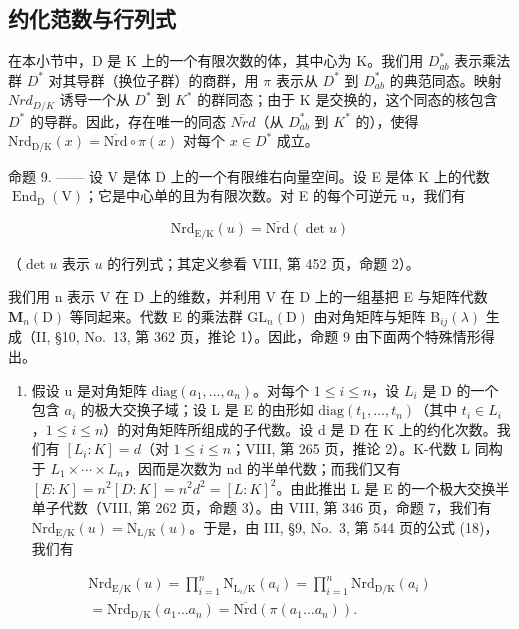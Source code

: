 \subsection{约化范数与行列式}

在本小节中，D 是 K 上的一个有限次数的体，其中心为 K。我们用 \(D_{ab}^{*}\) 表示乘法群 \(D^{*}\) 对其导群（换位子群）的商群，用 \(\pi\) 表示从 \(D^{*}\) 到 \(D_{ab}^{*}\) 的典范同态。映射 \(Nrd_{D/K}\) 诱导一个从 \(D^{*}\) 到 \(K^{*}\) 的群同态；由于 K 是交换的，这个同态的核包含 \(D^{*}\) 的导群。因此，存在唯一的同态 \(\overline{Nrd}\)（从 \(D_{ab}^{*}\) 到 \(K^{*}\) 的），使得 \(\mathrm{Nrd}_{\mathrm{D/K}}(x)=\overline{\mathrm{Nrd}}\circ\pi(x)\) 对每个 \(x\in D^{*}\) 成立。

命题 9. —— 设 V 是体 D 上的一个有限维右向量空间。设 E 是体 K 上的代数 \(\operatorname{End}_{\mathrm{D}}(\mathrm{V})\)；它是中心单的且为有限次数。对 E 的每个可逆元 u，我们有

\[
\mathrm{Nrd} _ {\mathrm{E/K}} (u) = \overline {{\mathrm{Nrd}}} (\det u)\tag{64}
\]

（\(\det u\) 表示 \(u\) 的行列式；其定义参看 VIII, 第 452 页，命题 2）。

我们用 n 表示 V 在 D 上的维数，并利用 V 在 D 上的一组基把 E 与矩阵代数 \(\mathbf{M}_{n}(\mathrm{D})\) 等同起来。代数 E 的乘法群 \(\mathrm{GL}_{n}(\mathrm{D})\) 由对角矩阵与矩阵 \(\mathrm{B}_{ij}(\lambda)\) 生成（II, §10, No.~13, 第 362 页，推论 1）。因此，命题 9 由下面两个特殊情形得出。

\begin{enumerate}
\def\labelenumi{\Alph{enumi})}
\tightlist
\item
  假设 u 是对角矩阵 \(\mathrm{diag}(a_{1},\ldots,a_{n})\)。对每个 \(1\leqslant i\leqslant n\)，设 \(L_{i}\) 是 D 的一个包含 \(a_{i}\) 的极大交换子域；设 L 是 E 的由形如 \(\mathrm{diag}(t_{1},\ldots,t_{n})\)（其中 \(t_{i}\in L_{i}\)，\(1\leqslant i\leqslant n\)）的对角矩阵所组成的子代数。设 d 是 D 在 K 上的约化次数。我们有 \([L_{i}:K]=d\)（对 \(1\leqslant i\leqslant n\)；VIII, 第 265 页，推论 2）。K-代数 L 同构于 \(L_{1}\times\cdots\times L_{n}\)，因而是次数为 nd 的半单代数；而我们又有 \([E:K]=n^{2}[D:K]=n^{2}d^{2}=[L:K]^{2}\)。由此推出 L 是 E 的一个极大交换半单子代数（VIII, 第 262 页，命题 3）。由 VIII, 第 346 页，命题 7，我们有 \(\mathrm{Nrd}_{\mathrm{E}/\mathrm{K}}(u)=\mathrm{N}_{\mathrm{L}/\mathrm{K}}(u)\)。于是，由 III, §9, No.~3, 第 544 页的公式 (18)，我们有
\end{enumerate}

\[
\begin{array}{c} \mathrm{Nrd} _ {\mathrm{E/K}} (u) = \prod_ {i = 1} ^ {n} \mathrm{N} _ {\mathrm{L} _ {i} / \mathrm{K}} (a _ {i}) = \prod_ {i = 1} ^ {n} \mathrm{Nrd} _ {\mathrm{D/K}} (a _ {i}) \\ = \mathrm{Nrd} _ {\mathrm{D/K}} (a _ {1} \dots a _ {n}) = \overline {{\mathrm{Nrd}}} (\pi (a _ {1} \dots a _ {n}))  . \end{array}
\]

